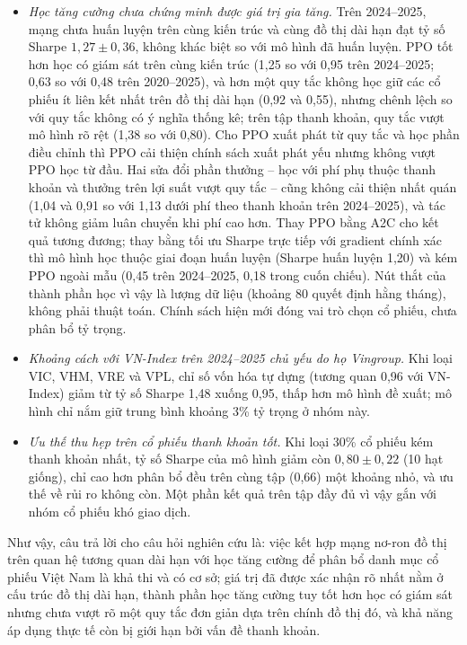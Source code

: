 \begin{itemize}
  \item \textit{Học tăng cường chưa chứng minh được giá trị gia tăng.} Trên 2024--2025, mạng chưa huấn luyện trên cùng kiến trúc và cùng đồ thị dài hạn đạt tỷ số Sharpe $1{,}27\pm0{,}36$, không khác biệt so với mô hình đã huấn luyện. PPO tốt hơn học có giám sát trên cùng kiến trúc (1,25 so với 0,95 trên 2024--2025; 0,63 so với 0,48 trên 2020--2025), và hơn một quy tắc không học giữ các cổ phiếu ít liên kết nhất trên đồ thị dài hạn (0,92 và 0,55), nhưng chênh lệch so với quy tắc không có ý nghĩa thống kê; trên tập thanh khoản, quy tắc vượt mô hình rõ rệt (1,38 so với 0,80). Cho PPO xuất phát từ quy tắc và học phần điều chỉnh thì PPO cải thiện chính sách xuất phát yếu nhưng không vượt PPO học từ đầu. Hai sửa đổi phần thưởng -- học với phí phụ thuộc thanh khoản và thưởng trên lợi suất vượt quy tắc -- cũng không cải thiện nhất quán (1,04 và 0,91 so với 1,13 dưới phí theo thanh khoản trên 2024--2025), và tác tử không giảm luân chuyển khi phí cao hơn. Thay PPO bằng A2C cho kết quả tương đương; thay bằng tối ưu Sharpe trực tiếp với gradient chính xác thì mô hình học thuộc giai đoạn huấn luyện (Sharpe huấn luyện 1,20) và kém PPO ngoài mẫu (0,45 trên 2024--2025, 0,18 trong cuốn chiếu). Nút thắt của thành phần học vì vậy là lượng dữ liệu (khoảng 80 quyết định hằng tháng), không phải thuật toán. Chính sách hiện mới đóng vai trò chọn cổ phiếu, chưa phân bổ tỷ trọng.
  \item \textit{Khoảng cách với VN-Index trên 2024--2025 chủ yếu do họ Vingroup.} Khi loại VIC, VHM, VRE và VPL, chỉ số vốn hóa tự dựng (tương quan 0,96 với VN-Index) giảm từ tỷ số Sharpe 1,48 xuống 0,95, thấp hơn mô hình đề xuất; mô hình chỉ nắm giữ trung bình khoảng 3\% tỷ trọng ở nhóm này.
  \item \textit{Ưu thế thu hẹp trên cổ phiếu thanh khoản tốt.} Khi loại 30\% cổ phiếu kém thanh khoản nhất, tỷ số Sharpe của mô hình giảm còn $0{,}80\pm0{,}22$ (10 hạt giống), chỉ cao hơn phân bổ đều trên cùng tập (0,66) một khoảng nhỏ, và ưu thế về rủi ro không còn. Một phần kết quả trên tập đầy đủ vì vậy gắn với nhóm cổ phiếu khó giao dịch.
\end{itemize}

Như vậy, câu trả lời cho câu hỏi nghiên cứu là: việc kết hợp mạng nơ-ron đồ thị trên quan hệ tương quan dài hạn với học tăng cường để phân bổ danh mục cổ phiếu Việt Nam là khả thi và có cơ sở; giá trị đã được xác nhận rõ nhất nằm ở cấu trúc đồ thị dài hạn, thành phần học tăng cường tuy tốt hơn học có giám sát nhưng chưa vượt rõ một quy tắc đơn giản dựa trên chính đồ thị đó, và khả năng áp dụng thực tế còn bị giới hạn bởi vấn đề thanh khoản.

